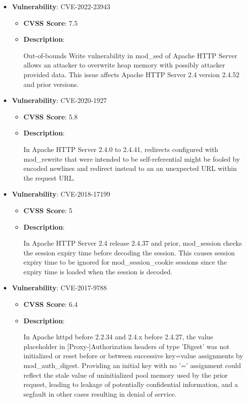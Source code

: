 \documentclass{article}
\begin{document}
\begin{itemize}
        \item \textbf{Vulnerability}: CVE-2022-23943
        \begin{itemize}
            \item \textbf{CVSS Score}:  7.5 
            \item \textbf{Description}:
            \parbox[t]{0.9\linewidth}{
                \ttfamily Out-of-bounds Write vulnerability in mod\_sed of Apache HTTP Server allows an attacker to overwrite heap memory with possibly attacker provided data. This issue affects Apache HTTP Server 2.4 version 2.4.52 and prior versions.
            }
        \end{itemize}
    
        \item \textbf{Vulnerability}: CVE-2020-1927
        \begin{itemize}
            \item \textbf{CVSS Score}:  5.8 
            \item \textbf{Description}:
            \parbox[t]{0.9\linewidth}{
                \ttfamily In Apache HTTP Server 2.4.0 to 2.4.41, redirects configured with mod\_rewrite that were intended to be self-referential might be fooled by encoded newlines and redirect instead to an an unexpected URL within the request URL.
            }
        \end{itemize}
    
        \item \textbf{Vulnerability}: CVE-2018-17199
        \begin{itemize}
            \item \textbf{CVSS Score}:  5 
            \item \textbf{Description}:
            \parbox[t]{0.9\linewidth}{
                \ttfamily In Apache HTTP Server 2.4 release 2.4.37 and prior, mod\_session checks the session expiry time before decoding the session. This causes session expiry time to be ignored for mod\_session\_cookie sessions since the expiry time is loaded when the session is decoded.
            }
        \end{itemize}
    
        \item \textbf{Vulnerability}: CVE-2017-9788
        \begin{itemize}
            \item \textbf{CVSS Score}:  6.4 
            \item \textbf{Description}:
            \parbox[t]{0.9\linewidth}{
                \ttfamily In Apache httpd before 2.2.34 and 2.4.x before 2.4.27, the value placeholder in [Proxy-]Authorization headers of type 'Digest' was not initialized or reset before or between successive key=value assignments by mod\_auth\_digest. Providing an initial key with no '=' assignment could reflect the stale value of uninitialized pool memory used by the prior request, leading to leakage of potentially confidential information, and a segfault in other cases resulting in denial of service.
            }
        \end{itemize}
    

\end{itemize}
\end{document}

